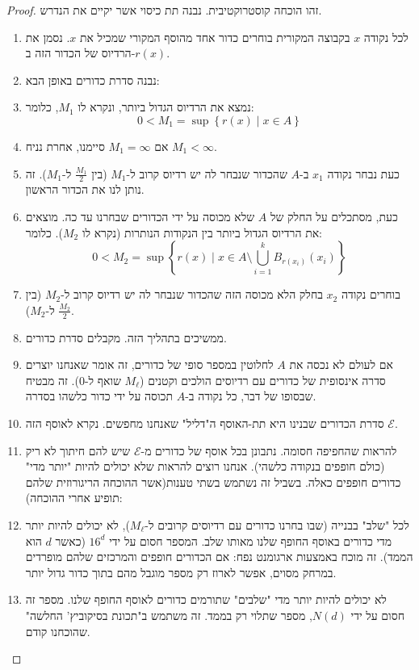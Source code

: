 \documentclass{tstextbook}
\begin{document}
\begin{proof}
זהו הוכחה קוסטרוקטיבית. נבנה תת כיסוי אשר יקיים את הנדרש.

  \begin{enumerate}
    \item לכל נקודה \(x\) בקבוצה המקורית בוחרים כדור אחד מהוסף המקורי שמכיל את \(x\). נסמן את הרדיוס של הכדור הזה ב-\(r(x)\). 


    \item נבנה סדרת כדורים באופן הבא: 


    \item נמצא את הרדיוס הגדול ביותר, ונקרא לו \(M_{1}\), כלומר:
$$0<M_{1}=\sup \left\{  r(x)\mid x \in A  \right\}$$
    \item אם \(M_{1}=\infty\) סיימנו, אחרת נניח \(M_{1}< \infty\). 
    \item כעת נבחר נקודה \(x_1\) ב-\(A\) שהכדור שנבחר לה יש רדיוס קרוב ל-\(M_1\) (בין \(\frac{M_1}{2}\) ל-\(M_1\)). זה נותן לנו את הכדור הראשון.
    \item כעת, מסתכלים על החלק של \(A\) שלא מכוסה על ידי הכדורים שבחרנו עד כה. מוצאים את הרדיוס הגדול ביותר בין הנקודות הנותרות (נקרא לו \(M_2\)). כלומר:
$$0<M_{2}=\sup \left\{  r(x)\mid x \in A \setminus  \bigcup_{i=1}^{k} B_{r(x_{i})}(x_{i})  \right\}$$
    \item בוחרים נקודה \(x_2\) בחלק הלא מכוסה הזה שהכדור שנבחר לה יש רדיוס קרוב ל-\(M_2\) (בין \(\frac{M_2}{2}\) ל-\(M_2\)).
    \item ממשיכים בתהליך הזה. מקבלים סדרת כדורים.


    \item אם לעולם לא נכסה את \(A\) לחלוטין במספר סופי של כדורים, זה אומר שאנחנו יוצרים סדרה אינסופית של כדורים עם רדיוסים הולכים וקטנים (\(M_\ell\) שואף ל-0). זה מבטיח שבסופו של דבר, כל נקודה ב-\(A\) תכוסה על ידי כדור כלשהו בסדרה. 


    \item סדרת הכדורים שבנינו היא תת-האוסף ה"דליל" שאנחנו מחפשים. נקרא לאוסף הזה \(\mathcal{E}\). 


    \item להראות שהחפיפה חסומה. נתבונן בכל אוסף של כדורים מ-\(\mathcal{E}\) שיש להם חיתוך לא ריק (כולם חופפים בנקודה כלשהי). אנחנו רוצים להראות שלא יכולים להיות "יותר מדי" כדורים חופפים כאלה. בשביל זה נשתמש בשתי טענות(אשר ההוכחה הריגורוזית שלהם תופיע אחרי ההוכחה): 


    \item לכל "שלב" בבנייה (שבו בחרנו כדורים עם רדיוסים קרובים ל-\(M_\ell\)), לא יכולים להיות יותר מדי כדורים באוסף החופף שלנו מאותו שלב. המספר חסום על ידי \(16^d\) (כאשר \(d\) הוא הממד). זה מוכח באמצעות ארגומנט נפח: אם הכדורים חופפים והמרכזים שלהם מופרדים במרחק מסוים, אפשר לארוז רק מספר מוגבל מהם בתוך כדור גדול יותר.
    \item לא יכולים להיות יותר מדי "שלבים" שתורמים כדורים לאוסף החופף שלנו. מספר זה חסום על ידי \(N(d)\), מספר שתלוי רק בממד. זה משתמש ב"תכונת בסיקוביץ' החלשה" שהוכחנו קודם.



\end{enumerate}
\end{proof}
\end{document}
